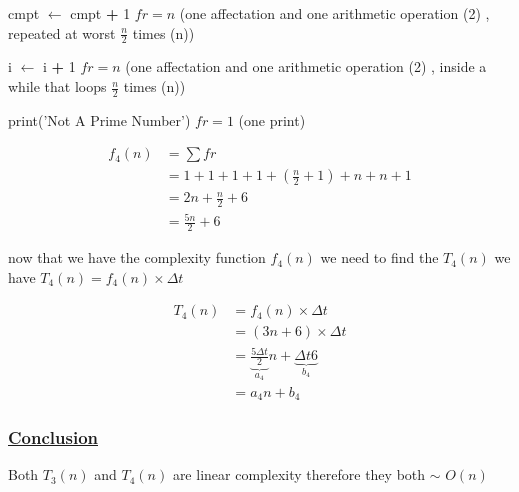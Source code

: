 \vspace{0.15cm}
cmpt $\gets$ cmpt \textcolor{redPlot}{ \textbf{+}} 1 \hspace{2.6cm} \(fr = n\) (one affectation and one arithmetic operation (2) , repeated at worst \(\frac{n}{2}\) times (n))

\vspace{0.15cm}
i $\gets$ i \textcolor{redPlot}{ \textbf{+}} 1 \hspace{4cm} \(fr = n\) (one affectation and one arithmetic operation (2) , inside a while that loops \(\frac{n}{2}\) times (n))

\vspace{0.15cm}

\textcolor{purplePlot!80!black}{print}(\textcolor{blueArea!60!black}{'Not A Prime Number'}) \hspace{0.9cm} \(fr = 1\) (one print)

\vspace{0.75cm}
\begin{align*}
f_4(n) &= \sum fr \\
       &= 1 + 1 + 1 + 1 + (\frac{n}{2}+1) + n + n + 1 \\
       &= 2n + \frac{n}{2} + 6 \\
       &= \boxed{\frac{5n}{2} + 6}
\end{align*}

\vspace{0.5cm} 
now that we have the complexity function \(f_4(n)\) we need to find the \(T_4(n)\)  we have \(T_4(n) = f_4(n) \times \Delta t\)

\begin{align*}
T_4(n) &= f_4(n) \times \Delta t\\ 
&= (3n + 6) \times \Delta t \\
&= \underbrace{\frac{5 \Delta t}{2}}_{a_4} n + \underbrace{\Delta t 6}_{b_4} \\
&= \boxed{a_4n+b_4} 
\end{align*}

\subsubsection*{\underline{Conclusion}}
Both \(T_3(n)\) and \(T_4(n)\) are linear complexity therefore they both $\sim$ \(O(n)\)

\vspace{1cm}


